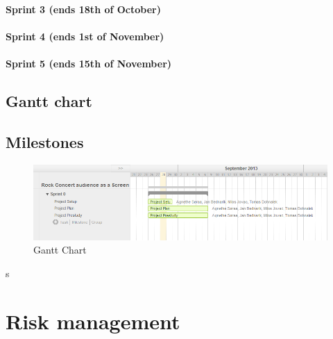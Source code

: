 \documentclass{article}
\begin{document}
\paragraph{Sprint 3 (ends 18th of October)}
\paragraph{Sprint 4 (ends 1st of November)}
\paragraph{Sprint 5 (ends 15th of November)}
\subsection{Gantt chart}

\subsection{Milestones}

\begin{figure}[ht]
\begin{center}
    \includegraphics[scale=0.6]{images/gantt}
    \caption{Gantt Chart}
    \label{img:gantt}
\end{center}
\end{figure}
s
\section{Risk management}
\end{document}
